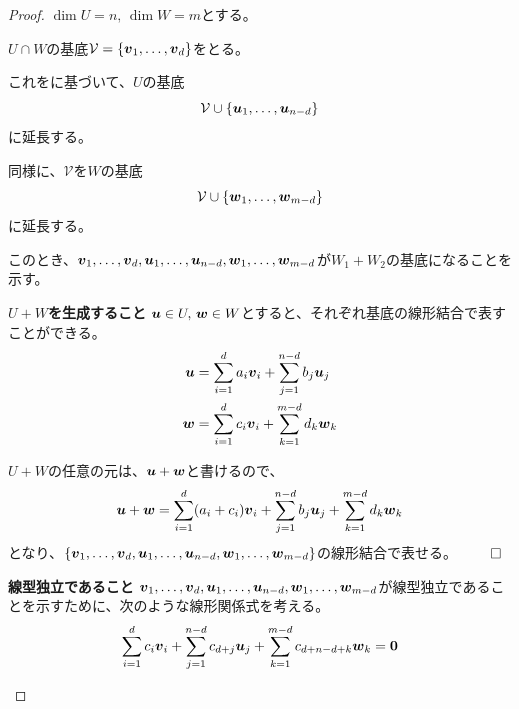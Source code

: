 \documentclass[../../../topic_linear-algebra]{subfiles}
\begin{document}
\begin{proof}
  $\dim U = n, \, \dim W = m$とする。

  \br

  $U \cap W$の基底$\mathcal{V} = \{ \vb*{v}_1,\dots, \vb*{v}_d \}$をとる。

  これをに基づいて、$U$の基底
  \begin{equation*}
    \mathcal{V} \cup \{ \vb*{u}_1, \dots, \vb*{u}_{n-d} \}
  \end{equation*}
  に延長する。

  同様に、$\mathcal{V}$を$W$の基底
  \begin{equation*}
    \mathcal{V} \cup \{ \vb*{w}_1, \dots, \vb*{w}_{m-d} \}
  \end{equation*}
  に延長する。

  \br

  このとき、$\vb*{v}_1, \dots, \vb*{v}_d, \vb*{u}_1, \dots, \vb*{u}_{n-d}, \vb*{w}_1, \dots, \vb*{w}_{m-d}$が$W_1 + W_2$の基底になることを示す。

  \begin{subpattern}{\bfseries $U+W$を生成すること}
    $\vb*{u} \in U, \, \vb*{w} \in W$とすると、それぞれ基底の線形結合で表すことができる。
    \begin{align*}
      \vb*{u} & = \sum_{i=1}^d a_i \vb*{v}_i + \sum_{j=1}^{n-d} b_j \vb*{u}_j \\
      \vb*{w} & = \sum_{i=1}^d c_i \vb*{v}_i + \sum_{k=1}^{m-d} d_k \vb*{w}_k
    \end{align*}

    \br

    $U+W$の任意の元は、$\vb*{u} + \vb*{w}$と書けるので、
    \begin{equation*}
      \vb*{u} + \vb*{w} = \sum_{i=1}^d (a_i + c_i) \vb*{v}_i + \sum_{j=1}^{n-d} b_j \vb*{u}_j + \sum_{k=1}^{m-d} d_k \vb*{w}_k
    \end{equation*}
    となり、$\{ \vb*{v}_1, \dots, \vb*{v}_d, \vb*{u}_1, \dots, \vb*{u}_{n-d}, \vb*{w}_1, \dots, \vb*{w}_{m-d} \}$の線形結合で表せる。 $\qed$
  \end{subpattern}

  \begin{subpattern}{\bfseries 線型独立であること}
    $\vb*{v}_1, \dots, \vb*{v}_d, \vb*{u}_1, \dots, \vb*{u}_{n-d}, \vb*{w}_1, \dots, \vb*{w}_{m-d}$が線型独立であることを示すために、次のような線形関係式を考える。
    \begin{equation*}
      \sum_{i=1}^d c_i \vb*{v}_i + \sum_{j=1}^{n-d} c_{d+j} \vb*{u}_j + \sum_{k=1}^{m-d} c_{d+n-d+k} \vb*{w}_k = \vb*{0}
    \end{equation*}


\end{subpattern}
\end{proof}
\end{document}
